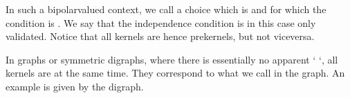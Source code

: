 \documentclass[a4paper,10pt,english]{sphinxhowto}
\begin{document}
In such a  bipolar\sphinxhyphen{}valued context, we call  a choice which is  and for which the  condition is . We say that the independence condition is in this case only  validated. Notice that all kernels are hence prekernels, but not vice\sphinxhyphen{}versa.

In graphs or symmetric digraphs, where there is essentially no apparent ‘  ‘, all kernels are    at the same time. They correspond to what we call  in the graph. An  example is given by the  digraph.
\end{document}
